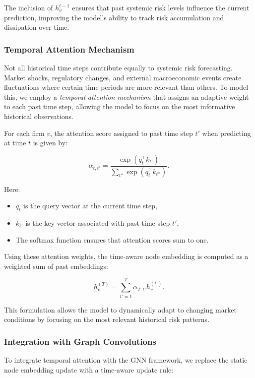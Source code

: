 \documentclass[preprint,12pt,authoryear]{elsarticle}
\begin{document}
The inclusion of \( h_v^{t-1} \) ensures that past systemic risk levels influence the current prediction, improving the model’s ability to track risk accumulation and dissipation over time.

\subsubsection{Temporal Attention Mechanism}  

Not all historical time steps contribute equally to systemic risk forecasting. Market shocks, regulatory changes, and external macroeconomic events create fluctuations where certain time periods are more relevant than others. To model this, we employ a \textit{temporal attention mechanism} that assigns an adaptive weight to each past time step, allowing the model to focus on the most informative historical observations.

For each firm \( v \), the attention score assigned to past time step \( t' \) when predicting at time \( t \) is given by:

\[
\alpha_{t,t'} = \frac{\exp( q_t^\top k_{t'} )}{\sum_{t''} \exp( q_t^\top k_{t''} )}.
\]

Here:
\begin{itemize}
    \item \( q_t \) is the query vector at the current time step,
    \item \( k_{t'} \) is the key vector associated with past time step \( t' \),
    \item The softmax function ensures that attention scores sum to one.
\end{itemize}

Using these attention weights, the time-aware node embedding is computed as a weighted sum of past embeddings:

\[
h_v^{(T)} = \sum_{t'=1}^{T} \alpha_{T,t'} h_v^{(t')}.
\]

This formulation allows the model to dynamically adapt to changing market conditions by focusing on the most relevant historical risk patterns.

\subsubsection{Integration with Graph Convolutions}  

To integrate temporal attention with the GNN framework, we replace the static node embedding update with a time-aware update rule:
\end{document}
